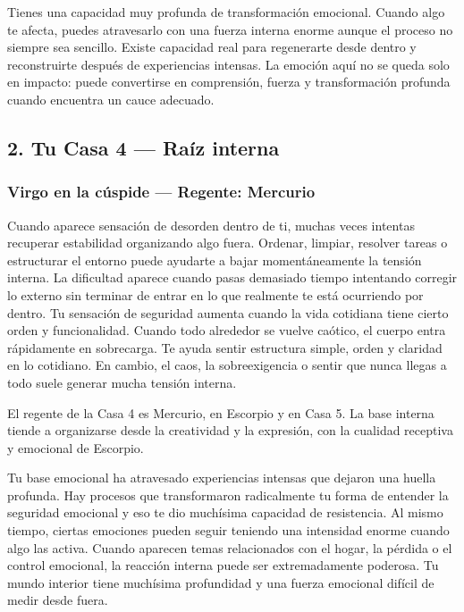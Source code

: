 \documentclass[11pt,a4paper]{article}
\begin{document}
Tienes una capacidad muy profunda de transformación emocional. Cuando algo te afecta, puedes atravesarlo con una fuerza interna enorme aunque el proceso no siempre sea sencillo. Existe capacidad real para regenerarte desde dentro y reconstruirte después de experiencias intensas. La emoción aquí no se queda solo en impacto: puede convertirse en comprensión, fuerza y transformación profunda cuando encuentra un cauce adecuado.

\vspace{0.8cm}

\subsection{2. Tu Casa 4 — Raíz interna}

\subsubsection*{Virgo en la cúspide — Regente: Mercurio}

Cuando aparece sensación de desorden dentro de ti, muchas veces intentas recuperar estabilidad organizando algo fuera. Ordenar, limpiar, resolver tareas o estructurar el entorno puede ayudarte a bajar momentáneamente la tensión interna. La dificultad aparece cuando pasas demasiado tiempo intentando corregir lo externo sin terminar de entrar en lo que realmente te está ocurriendo por dentro. Tu sensación de seguridad aumenta cuando la vida cotidiana tiene cierto orden y funcionalidad. Cuando todo alrededor se vuelve caótico, el cuerpo entra rápidamente en sobrecarga. Te ayuda sentir estructura simple, orden y claridad en lo cotidiano. En cambio, el caos, la sobreexigencia o sentir que nunca llegas a todo suele generar mucha tensión interna.

El regente de la Casa 4 es Mercurio, en Escorpio y en Casa 5. La base interna tiende a organizarse desde la creatividad y la expresión, con la cualidad receptiva y emocional de Escorpio.

Tu base emocional ha atravesado experiencias intensas que dejaron una huella profunda. Hay procesos que transformaron radicalmente tu forma de entender la seguridad emocional y eso te dio muchísima capacidad de resistencia. Al mismo tiempo, ciertas emociones pueden seguir teniendo una intensidad enorme cuando algo las activa. Cuando aparecen temas relacionados con el hogar, la pérdida o el control emocional, la reacción interna puede ser extremadamente poderosa. Tu mundo interior tiene muchísima profundidad y una fuerza emocional difícil de medir desde fuera.
\end{document}
